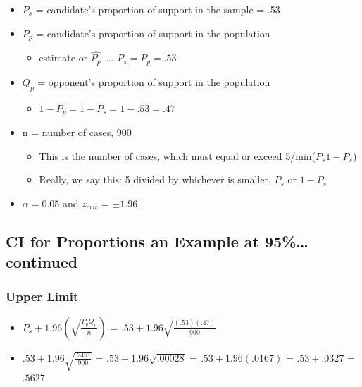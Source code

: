 \documentclass[]{article}
\begin{document}
\begin{itemize}
\itemsep1pt\parskip0pt
\item
  $P_s$ = candidate's proportion of support in the sample = .53
\item
  $P_p$ = candidate's proportion of support in the population

  \begin{itemize}
  \itemsep1pt\parskip0pt
  \item
    estimate or $\hat{P_p}$ \ldots{}. $P_s = P_p = .53$
  \end{itemize}
\item
  $Q_p$ = opponent's proportion of support in the population

  \begin{itemize}
  \itemsep1pt\parskip0pt
  \item
    $1 - P_p = 1- P_s = 1 - .53 = .47$
  \end{itemize}
\item
  n = number of cases, 900

  \begin{itemize}
  \itemsep1pt\parskip0pt
  \item
    This is the number of cases, which must equal or exceed
    5/min($P_s 1-P_s$)
  \item
    Really, we say this: 5 divided by whichever is smaller, $P_s$ or
    $1-P_s$
  \end{itemize}
\item
  $\alpha = 0.05$ and $z_{crit}$ = $\pm 1.96$
\end{itemize}

\subsection{CI for Proportions an Example at 95\%\ldots{}
continued}\label{ci-for-proportions-an-example-at-95-continued}

\subsubsection{Upper Limit}\label{upper-limit}

\begin{itemize}
\itemsep1pt\parskip0pt
\item
  $P_s + 1.96(\sqrt{\frac{P_p Q_p}{n}})$ =
  $.53 +1.96 \sqrt{\frac{(.53)(.47)}{900}}$
\item
  $.53 +1.96 \sqrt{\frac{.2491}{900}}$ = $.53 +1.96 \sqrt{.00028}$ =
  $.53 + 1.96(.0167)$ = $.53 + .0327$ = $.5627$
\end{itemize}
\end{document}
